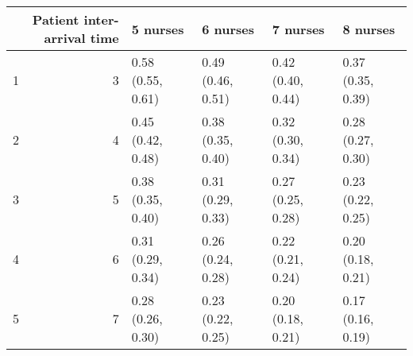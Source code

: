 \begin{table}[ht]
\centering
\begin{tabular}{rrllll}
  \hline
 & Patient inter-arrival time & 5 nurses & 6 nurses & 7 nurses & 8 nurses \\ 
  \hline
1 &   3 & 0.58 (0.55, 0.61) & 0.49 (0.46, 0.51) & 0.42 (0.40, 0.44) & 0.37 (0.35, 0.39) \\ 
  2 &   4 & 0.45 (0.42, 0.48) & 0.38 (0.35, 0.40) & 0.32 (0.30, 0.34) & 0.28 (0.27, 0.30) \\ 
  3 &   5 & 0.38 (0.35, 0.40) & 0.31 (0.29, 0.33) & 0.27 (0.25, 0.28) & 0.23 (0.22, 0.25) \\ 
  4 &   6 & 0.31 (0.29, 0.34) & 0.26 (0.24, 0.28) & 0.22 (0.21, 0.24) & 0.20 (0.18, 0.21) \\ 
  5 &   7 & 0.28 (0.26, 0.30) & 0.23 (0.22, 0.25) & 0.20 (0.18, 0.21) & 0.17 (0.16, 0.19) \\ 
   \hline
\end{tabular}
\end{table}

